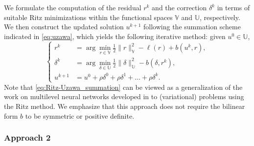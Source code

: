 \documentclass{article}
\theoremstyle{definition}
\begin{document}
We formulate the computation of the residual $r^k$ and the correction $\delta^k$ in terms of suitable Ritz minimizations within the functional spaces $\mathbb{V}$ and $\mathbb{U}$, respectively. We then construct the updated solution $u^{k+1}$ following the summation scheme indicated in \eqref{eq:uzawa}, which yields the following iterative method: given $u^0\in\mathbb{U}$,
\begin{equation}
    \left\{
    \begin{aligned}
        r^{k} &= \arg\min_{r\in \mathbb{V}} \frac{1}{2} \|r\|^2_{\mathbb{V}} - \ell(r) + b(u^k,r), \\[1ex]
        \delta^{k} &= \arg\min_{\delta\in \mathbb{U}} \frac{1}{2} \|\delta\|^2_{\mathbb{U}} - b(\delta,r^{k}), \\[1ex]
        u^{k+1} &= u^0 + \rho \delta^0 + \rho \delta^1 + \ldots + \rho\delta^k.
    \end{aligned}
    \right.
    \label{eq:Ritz-Uzawa_summation}
\end{equation}
Note that \eqref{eq:Ritz-Uzawa_summation} can be viewed as a generalization of the work on multilevel neural networks developed in \cite{aldirany2024multi} to (variational) problems using the Ritz method.
We emphasize that this approach does not require the bilinear form $b$ to be symmetric or positive definite.

\subsubsection{Approach 2} \label{subsection:main_approach2}
\end{document}
